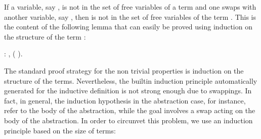 If a variable, say , is not in the set of free variables of a term  and one swaps  with another variable, say , then  is not in the set of free variables of the term . This is the content of the following lemma that can easily be proved using induction on the structure of the term :
\begin{coqdoccode}
\coqdocnoindent
{}  : \coqdockw{\ensuremath{\forall}}   ,         (   ).\coqdoceol
\coqdocemptyline
\coqdocemptyline
\end{coqdoccode}
The standard proof strategy for the non trivial properties is induction on the structure of the terms. Nevertheless, the builtin induction principle automatically generated for the inductive definition  is not strong enough due to swappings. In fact, in general, the induction hypothesis in the abstraction case, for instance, refer to the body of the abstraction, while the goal involves a swap acting on the body of the abstraction. In order to circunvet this problem, we use an induction principle based on the size of terms: 
